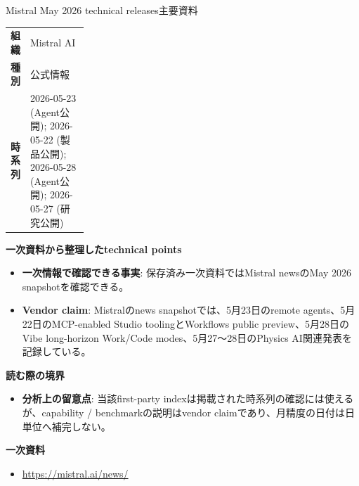 \begin{technicalnote}{Mistral May 2026 technical releases}{主要資料}
\begingroup
\begin{tabularx}{\linewidth}{@{}>{\bfseries}p{0.22\linewidth}X@{}}
組織 & Mistral AI \\
種別 & 公式情報 \\
時系列 & 2026-05-23 (Agent公開); 2026-05-22 (製品公開); 2026-05-28 (Agent公開); 2026-05-27 (研究公開) \\
\end{tabularx}
\smallskip
{\bfseries 一次資料から整理したtechnical points}
\begin{itemize}[leftmargin=1.5em,itemsep=0.35em]
\item \textbf{一次情報で確認できる事実}: 保存済み一次資料ではMistral newsのMay 2026 snapshotを確認できる。
\item \textbf{Vendor claim}: Mistralのnews snapshotでは、5月23日のremote agents、5月22日のMCP-enabled Studio toolingとWorkflows public preview、5月28日のVibe long-horizon Work/Code modes、5月27〜28日のPhysics AI関連発表を記録している。
\end{itemize}
{\bfseries 読む際の境界}
\begin{itemize}[leftmargin=1.5em,itemsep=0.35em]
\item \textbf{分析上の留意点}: 当該first-party indexは掲載された時系列の確認には使えるが、capability / benchmarkの説明はvendor claimであり、月精度の日付は日単位へ補完しない。
\end{itemize}
\begin{samepage}
{\bfseries 一次資料}
\begingroup\sloppy
\begin{itemize}[leftmargin=1.5em,itemsep=0.25em]
\item {\scriptsize\url{https://mistral.ai/news/}}
\end{itemize}
\endgroup
\end{samepage}
\endgroup
\end{technicalnote}
\medskip

